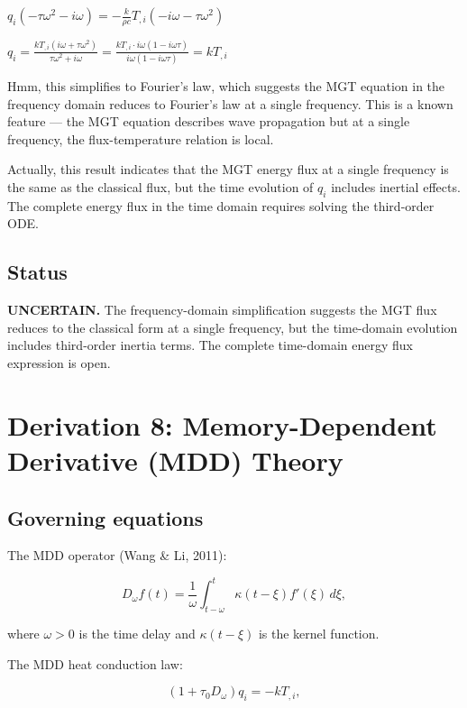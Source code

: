 $q_i(-\tau\omega^2 - i\omega) = -\frac{k}{\rho c}T_{,i}(-i\omega - \tau\omega^2)$

$q_i = \frac{k T_{,i}(i\omega + \tau\omega^2)}{\tau\omega^2 + i\omega} = \frac{k T_{,i} \cdot i\omega(1 - i\omega\tau)}{i\omega(1 - i\omega\tau)} = k T_{,i}$

Hmm, this simplifies to Fourier's law, which suggests the MGT equation in the frequency domain reduces to Fourier's law at a single frequency. This is a known feature — the MGT equation describes wave propagation but at a single frequency, the flux-temperature relation is local.

Actually, this result indicates that the MGT energy flux at a single frequency is the same as the classical flux, but the time evolution of $q_i$ includes inertial effects. The complete energy flux in the time domain requires solving the third-order ODE.

\subsection{Status}

\textbf{UNCERTAIN.} The frequency-domain simplification suggests the MGT flux reduces to the classical form at a single frequency, but the time-domain evolution includes third-order inertia terms. The complete time-domain energy flux expression is open.

\section{Derivation 8: Memory-Dependent Derivative (MDD) Theory}

\subsection{Governing equations}

The MDD operator (Wang \& Li, 2011):

\begin{equation}
D_\omega f(t) = \frac{1}{\omega}\int_{t-\omega}^{t} \kappa(t-\xi) f'(\xi) \, d\xi,
\label{ef:mdd:1}
\end{equation}

where $\omega > 0$ is the time delay and $\kappa(t-\xi)$ is the kernel function.

The MDD heat conduction law:

\begin{equation}
(1 + \tau_0 D_\omega)q_i = -k T_{,i},
\label{ef:mdd:2}
\end{equation}

